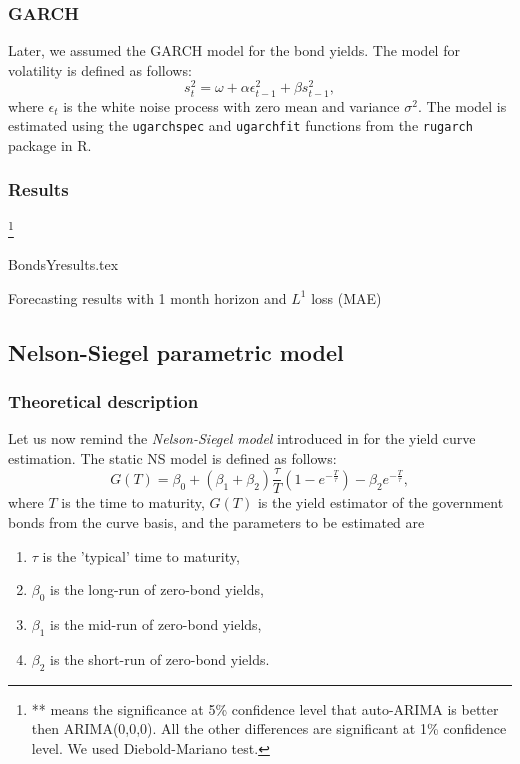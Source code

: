         \subsubsection{GARCH}
            Later, we assumed the GARCH model for the bond yields. The model for volatility is defined as follows:
            \begin{equation}\label{eq:GARCH}
                s_t^2 = \omega + \alpha \epsilon_{t-1}^2 + \beta s_{t-1}^2,
            \end{equation}
            where $\epsilon_t$ is the white noise process with zero mean and variance $\sigma^2$.
            The model is estimated using the \texttt{ugarchspec} and \texttt{ugarchfit} functions from the \texttt{rugarch} package in R.
            
        \subsubsection{Results}\footnote{** means the significance at 5\% confidence level that auto-ARIMA is better then ARIMA(0,0,0). 
        All the other differences are significant at 1\% confidence level. We used Diebold-Mariano test. }
        \

            \begin{table}[!htbp]
                {BondsYresults.tex}
                \label{tab:naiveres}
                \caption{Forecasting results with 1 month horizon and $L^1$ loss (MAE)}
            \end{table}

    \subsection{Nelson-Siegel parametric model}
        \subsubsection{Theoretical description}
            Let us now remind the \emph{Nelson-Siegel model} introduced in \cite{Nelson1987} for the yield curve estimation. The 
            static NS model is defined as follows:
            \begin{equation}\label{eq:NS}
                G(T) = \beta_0 + (\beta_1+\beta_2)\frac{\tau}{T}\left(1-e^{-\frac{T}{\tau}}\right)-\beta_2  e^{-\frac{T}{\tau}},
            \end{equation}
            where $T$ is the time to maturity, $G(T)$ is the yield estimator of the government bonds from the curve basis, 
            and the parameters to be estimated are
            \begin{enumerate}
                \item $\tau$ is the 'typical' time to maturity, 
                \item $\beta_0$ is the long-run of zero-bond yields, 
                \item $\beta_1$ is the mid-run of zero-bond yields, 
                \item $\beta_2$ is the short-run of zero-bond yields.
            \end{enumerate}

